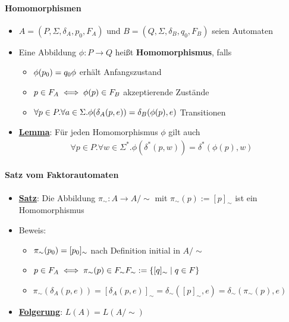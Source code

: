 \documentclass{scrartcl}
\begin{document}
\paragraph{Homomorphismen}

\begin{itemize}
	\item $A = (P, \Sigma, \delta_A, p_0, F_A)$ und $B = (Q, \Sigma, \delta_B, q_0, F_B)$ seien Automaten
	\item Eine Abbildung $\phi : P \rightarrow Q$ heißt \textbf{Homomorphismus}, falls
	\begin{itemize}
		\item $\phi(p_0) = q_0 \hfill \phi$ erhält Anfangszustand
		\item $p \in F_A \iff \phi(p) \in F_B \hfill$ akzeptierende Zustände
		\item $\forall p \in P. \forall a \in \Sigma. \phi(\delta_A(p,e)) = \delta_B(\phi(p),e) \hfill$ Transitionen
	\end{itemize}
	\item \underline{\textbf{Lemma}}: Für jeden Homomorphismus $\phi$ gilt auch
	\begin{align*}
		\forall p \in P. \forall w \in \Sigma^*. \phi(\delta^*(p,w)) = \delta^*(\phi(p),w)
	\end{align*}
\end{itemize}

\paragraph{Satz vom Faktorautomaten}

\begin{itemize}
	\item \underline{\textbf{Satz}}: Die Abbildung $\pi_\sim: A \rightarrow A/\sim$ mit $\pi_\sim(p) := [p]_\sim$ ist ein Homomorphismus
	\item Beweis:
	\begin{itemize}
		\item $\pi_\sim(p_0) = [p_0]_\sim \hfill$ nach Definition initial in $A/\sim$
		\item $p \in F_A \iff \pi_\sim(p) \in F_\sim \hfill F_\sim := \{ [q]_\sim \mid q \in F \}$
		\item $\pi_\sim(\delta_A(p,e)) = [\delta_A(p,e)]_\sim = \delta_\sim([p]_\sim,e) = \delta_\sim(\pi_\sim(p),e)$
	\end{itemize}
	\item \underline{\textbf{Folgerung}}: $L(A) = L(A/\sim)$
\end{itemize}
\end{document}
